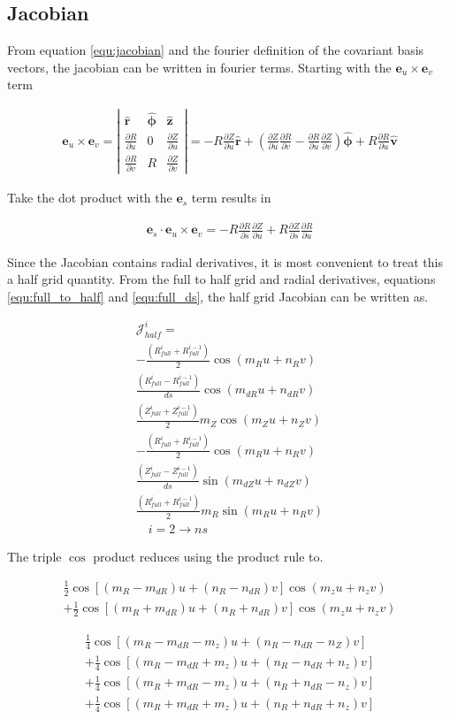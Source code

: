 \documentclass[11pt]{article}
\newcommand{\brackets}[1]{\left(#1\right)}
\newcommand{\sqbrackets}[1]{\left[#1\right]}
\renewcommand{\vec}[1]{\boldsymbol#1}
\newcommand{\unitv}[1]{\hat{\vec{#1}}}
\newcommand{\co}[1]{\vec{e}_{#1}}
\newcommand{\pd}[2]{\frac{\partial#1}{\partial#2}}
\newcommand{\equ}[2]{
	\begin{equation}
    \begin{split}
	#1
	\label{#2}
	\end{split}
	\end{equation}
}
\newcommand{\dotp}[2]{#1\cdot#2}
\newcommand{\crossp}[2]{#1\times#2}
\begin{document}
\subsection{Jacobian}
From equation \ref{equ:jacobian} and the fourier definition of the covariant basis vectors, the jacobian can be written in fourier terms.
Starting with the $\crossp{\co{u}}{\co{v}}$ term
\equ{
\crossp{\co{u}}{\co{v}}=\left|
\begin{array}{ccc}
\unitv{r} & \unitv{\phi} & \unitv{z} \\
\pd{R}{u} & 0            & \pd{Z}{u} \\
\pd{R}{v} & R            & \pd{Z}{v}
\end{array}
\right|=-R\pd{Z}{u}\unitv{r}+\brackets{\pd{Z}{u}\pd{R}{v}-\pd{R}{u}\pd{Z}{v}}\unitv{\phi}+R\pd{R}{u}\unitv{v}
}{equ:jacobian_cross}
Take the dot product with the $\co{s}$ term results in
\equ{
\dotp{\co{s}}{\crossp{\co{u}}{\co{v}}}=-R\pd{R}{s}\pd{Z}{u}+R\pd{Z}{s}\pd{R}{u}
}{equ:jacobian_full}
Since the Jacobian contains radial derivatives, it is most convenient to treat this a half grid quantity.
From the full to half grid and radial derivatives, equations \ref{equ:full_to_half} and \ref{equ:full_ds}, the half grid Jacobian can be written as.
\equ{
\mathcal{J}^{i}_{half}=\\
-\frac{\brackets{R^{i}_{full}+R^{i-1}_{full}}}{2}\cos\brackets{m_{R}u+n_{R}v}\\
\frac{\brackets{R^{i}_{full}-R^{i-1}_{full}}}{ds}\cos\brackets{m_{dR}u+n_{dR}v}\\
\frac{\brackets{Z^{i}_{full}+Z^{i-1}_{full}}}{2}m_{Z}\cos\brackets{m_{Z}u+n_{Z}v}\\
-\frac{\brackets{R^{i}_{full}+R^{i-1}_{full}}}{2}\cos\brackets{m_{R}u+n_{R}v}\\
\frac{\brackets{Z^{i}_{full}-Z^{i-1}_{full}}}{ds}\sin\brackets{m_{dZ}u+n_{dZ}v}\\
\frac{\brackets{R^{i}_{full}+R^{i-1}_{full}}}{2}m_{R}\sin\brackets{m_{R}u+n_{R}v}\\
\quad i=2\rightarrow ns
}{equ:jacobian_half}
The triple $\cos$ product reduces using the product rule to.
\equ{
\frac{1}{2}\cos\sqbrackets{\brackets{m_{R}-m_{dR}}u+\brackets{n_{R}-n_{dR}}v}\cos\brackets{m_{z}u+n_{z}v}\\
+\frac{1}{2}\cos\sqbrackets{\brackets{m_{R}+m_{dR}}u+\brackets{n_{R}+n_{dR}}v}\cos\brackets{m_{z}u+n_{z}v}
}{equ:jacobian_cos}
\equ{
\frac{1}{4}\cos\sqbrackets{\brackets{m_{R}-m_{dR}-m_{z}}u+\brackets{n_{R}-n_{dR}-n_{Z}}v}\\
+\frac{1}{4}\cos\sqbrackets{\brackets{m_{R}-m_{dR}+m_{z}}u+\brackets{n_{R}-n_{dR}+n_{z}}v}\\
+\frac{1}{4}\cos\sqbrackets{\brackets{m_{R}+m_{dR}-m_{z}}u+\brackets{n_{R}+n_{dR}-n_{z}}v}\\
+\frac{1}{4}\cos\sqbrackets{\brackets{m_{R}+m_{dR}+m_{z}}u+\brackets{n_{R}+n_{dR}+n_{z}}v}
}{equ:jacobian_cos2}
\end{document}
